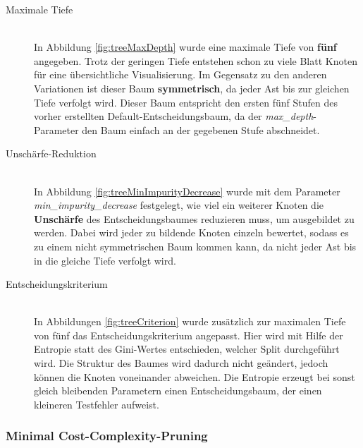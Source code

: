 \begin{description}
	\item[Maximale Tiefe]\hfill \\
	In Abbildung \ref{fig:treeMaxDepth} wurde eine maximale Tiefe von \textbf{fünf} angegeben. Trotz der geringen Tiefe entstehen schon zu viele Blatt Knoten für eine übersichtliche Visualisierung. Im Gegensatz zu den anderen Variationen ist dieser Baum \textbf{symmetrisch}, da jeder Ast bis zur gleichen Tiefe verfolgt wird. Dieser Baum entspricht den ersten fünf Stufen des vorher erstellten Default-Entscheidungsbaum, da der \emph{max\_depth}-Parameter den Baum einfach an der gegebenen Stufe abschneidet.
	\item[Unschärfe-Reduktion]\hfill \\ 
	In Abbildung \ref{fig:treeMinImpurityDecrease} wurde mit dem Parameter \emph{min\_impurity\_decrease} festgelegt, wie viel ein weiterer Knoten die \textbf{Unschärfe} des Entscheidungsbaumes reduzieren muss, um ausgebildet zu werden. Dabei wird jeder zu bildende Knoten einzeln bewertet, sodass es zu einem nicht symmetrischen Baum kommen kann, da nicht jeder Ast bis in die gleiche Tiefe verfolgt wird.
	\item[Entscheidungskriterium]\hfill \\ 
	In Abbildungen \ref{fig:treeCriterion} wurde zusätzlich zur maximalen Tiefe von fünf das Entscheidungskriterium angepasst. Hier wird mit Hilfe der Entropie statt des Gini-Wertes entschieden, welcher Split durchgeführt wird. Die Struktur des Baumes wird dadurch nicht geändert, jedoch können die Knoten voneinander abweichen. Die Entropie erzeugt bei sonst gleich bleibenden Parametern einen Entscheidungsbaum, der einen kleineren Testfehler aufweist.
\end{description}
\subsubsection{Minimal Cost-Complexity-Pruning}



